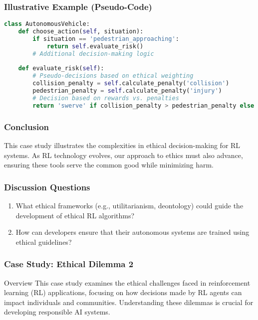 \documentclass{beamer}
\begin{document}
\begin{frame}[fragile]
    \frametitle{Illustrative Example (Pseudo-Code)}
    \begin{lstlisting}[language=Python]
class AutonomousVehicle:
    def choose_action(self, situation):
        if situation == 'pedestrian_approaching':
            return self.evaluate_risk()
        # Additional decision-making logic
        
    def evaluate_risk(self):
        # Pseudo-decisions based on ethical weighting
        collision_penalty = self.calculate_penalty('collision')
        pedestrian_penalty = self.calculate_penalty('injury')
        # Decision based on rewards vs. penalties
        return 'swerve' if collision_penalty > pedestrian_penalty else 'go straight'
    \end{lstlisting}
\end{frame}

\begin{frame}
    \frametitle{Conclusion}
    This case study illustrates the complexities in ethical decision-making for RL systems. 
    As RL technology evolves, our approach to ethics must also advance, ensuring these tools serve the common good while minimizing harm.
\end{frame}

\begin{frame}
    \frametitle{Discussion Questions}
    \begin{enumerate}
        \item What ethical frameworks (e.g., utilitarianism, deontology) could guide the development of ethical RL algorithms?
        \item How can developers ensure that their autonomous systems are trained using ethical guidelines?
    \end{enumerate}
\end{frame}

\begin{frame}[fragile]
    \frametitle{Case Study: Ethical Dilemma 2}
    \begin{block}{Overview}
        This case study examines the ethical challenges faced in reinforcement learning (RL) applications, focusing on how decisions made by RL agents can impact individuals and communities. Understanding these dilemmas is crucial for developing responsible AI systems.
    \end{block}
\end{frame}
\end{document}
